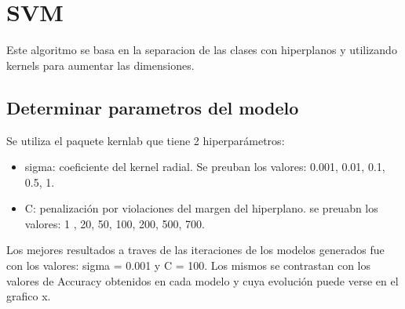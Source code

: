 \documentclass[]{article}
\begin{document}
\hypertarget{svm}{%
\section{SVM}\label{svm}}

Este algoritmo se basa en la separacion de las clases con hiperplanos y
utilizando kernels para aumentar las dimensiones.

\hypertarget{determinar-parametros-del-modelo-3}{%
\subsection{Determinar parametros del
modelo}\label{determinar-parametros-del-modelo-3}}

Se utiliza el paquete kernlab que tiene 2 hiperparámetros:

\begin{itemize}
\item
  sigma: coeficiente del kernel radial. Se preuban los valores: 0.001,
  0.01, 0.1, 0.5, 1.
\item
  C: penalización por violaciones del margen del hiperplano. se preuabn
  los valores: 1 , 20, 50, 100, 200, 500, 700.
\end{itemize}

Los mejores resultados a traves de las iteraciones de los modelos
generados fue con los valores: sigma = 0.001 y C = 100. Los mismos se
contrastan con los valores de Accuracy obtenidos en cada modelo y cuya
evolución puede verse en el grafico x.
\end{document}

